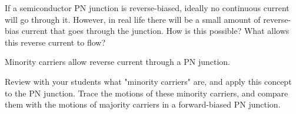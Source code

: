 

If a semiconductor PN junction is reverse-biased, ideally no continuous current will go through it.  However, in real life there will be a small amount of reverse-bias current that goes through the junction.  How is this possible?  What allows this reverse current to flow?







Minority carriers allow reverse current through a PN junction.







Review with your students what "minority carriers" are, and apply this concept to the PN junction.  Trace the motions of these minority carriers, and compare them with the motions of majority carriers in a forward-biased PN junction.




